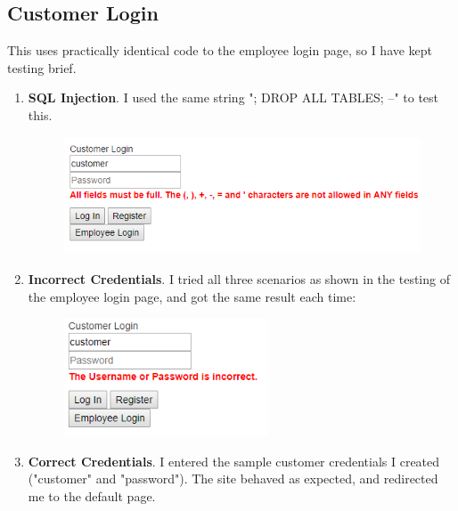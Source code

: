 ﻿\documentclass{article}
\begin{document}
    \subsection{Customer Login}
    This uses practically identical code to the employee login page, so I have kept testing brief.
    \begin{enumerate}
        \item \textbf{SQL Injection}.
        I used the same string "; DROP ALL TABLES; --" to test this.
        \begin{figure}[H]
            \includegraphics[height=3.5cm]{testing/cusLogin1.png}
            \centering
        \end{figure}
        \item \textbf{Incorrect Credentials}.
        I tried all three scenarios as shown in the testing of the employee login page, and got the same result each time:
        \begin{figure}[H]
            \includegraphics[height=3.5cm]{testing/cusLogin2.png}
            \centering
        \end{figure}
        \item \textbf{Correct Credentials}.
        I entered the sample customer credentials I created ("customer" and "password").
        The site behaved as expected, and redirected me to the default page.
    \end{enumerate}
    \newpage
\end{document}
